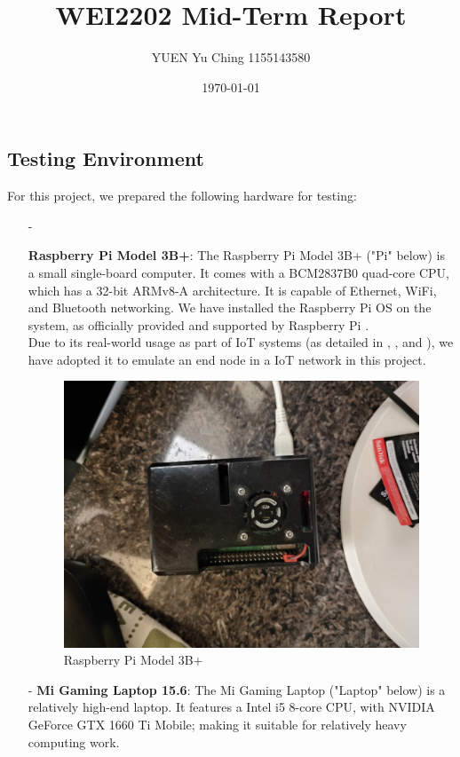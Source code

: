 \documentclass{article}
\title{WEI2202 Mid-Term Report}
\author{YUEN Yu Ching 1155143580}
\date{\today}
\begin{document}
\maketitle
\begin{multicols}{2}
\section{Testing Environment}
For this project, we prepared the following hardware for testing:
\begin{itemize}
\item[-]{
\textbf{Raspberry Pi Model 3B+}: The Raspberry Pi Model 3B+ ("Pi" below) is a small single-board computer. It comes with a BCM2837B0 quad-core CPU, which has a 32-bit ARMv8-A architecture. It is capable of Ethernet, WiFi, and Bluetooth networking. We have installed the Raspberry Pi OS on the system, as officially provided and supported by Raspberry Pi \cite{rasppi.os.2022}.\\
Due to its real-world usage as part of IoT systems (as detailed in \cite{9767905}, \cite{8597424}, and \cite{8356449}), we have adopted it to emulate an end node in a IoT network in this project.
\begin{minipage}{0.4\textwidth}\begin{figure}[H]\includegraphics[width=\linewidth]{rasppi}
\caption{Raspberry Pi Model 3B+}
\end{figure}\end{minipage}
}
\item[-]{
\textbf{Mi Gaming Laptop 15.6}: The Mi Gaming Laptop ("Laptop" below) is a relatively high-end laptop. It features a Intel i5 8-core CPU, with NVIDIA GeForce GTX 1660 Ti Mobile; making it suitable for relatively heavy computing work.\\
}
\end{itemize}
\end{multicols}
\end{document}
